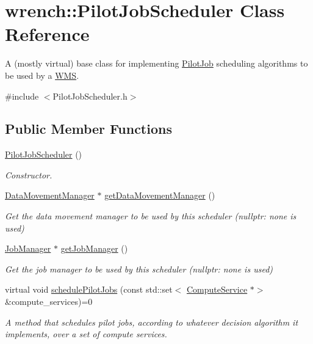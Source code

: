 \hypertarget{classwrench_1_1_pilot_job_scheduler}{}\section{wrench\+:\+:Pilot\+Job\+Scheduler Class Reference}
\label{classwrench_1_1_pilot_job_scheduler}


A (mostly virtual) base class for implementing \hyperlink{classwrench_1_1_pilot_job}{Pilot\+Job} scheduling algorithms to be used by a \hyperlink{classwrench_1_1_w_m_s}{W\+MS}.  




{\ttfamily \#include $<$Pilot\+Job\+Scheduler.\+h$>$}

\subsection*{Public Member Functions}
\begin{DoxyCompactItemize}
\item 
\mbox{\label{classwrench_1_1_pilot_job_scheduler_ab230034aa98439169dc78bcf82bfced8}} 
\hyperlink{classwrench_1_1_pilot_job_scheduler_ab230034aa98439169dc78bcf82bfced8}{Pilot\+Job\+Scheduler} ()
\begin{DoxyCompactList}\small\item\em Constructor. \end{DoxyCompactList}\item 
\hyperlink{classwrench_1_1_data_movement_manager}{Data\+Movement\+Manager} $\ast$ \hyperlink{classwrench_1_1_pilot_job_scheduler_ab161a17fd3c1a7f5af171f813e32f3a1}{get\+Data\+Movement\+Manager} ()
\begin{DoxyCompactList}\small\item\em Get the data movement manager to be used by this scheduler (nullptr\+: none is used) \end{DoxyCompactList}\item 
\hyperlink{classwrench_1_1_job_manager}{Job\+Manager} $\ast$ \hyperlink{classwrench_1_1_pilot_job_scheduler_acd33b44c3481d911489626dc3f0ea957}{get\+Job\+Manager} ()
\begin{DoxyCompactList}\small\item\em Get the job manager to be used by this scheduler (nullptr\+: none is used) \end{DoxyCompactList}\item 
virtual void \hyperlink{classwrench_1_1_pilot_job_scheduler_a903c44145dfce2964f90cc856146adbb}{schedule\+Pilot\+Jobs} (const std\+::set$<$ \hyperlink{classwrench_1_1_compute_service}{Compute\+Service} $\ast$$>$ \&compute\+\_\+services)=0
\begin{DoxyCompactList}\small\item\em A method that schedules pilot jobs, according to whatever decision algorithm it implements, over a set of compute services. \end{DoxyCompactList}\end{DoxyCompactItemize}


